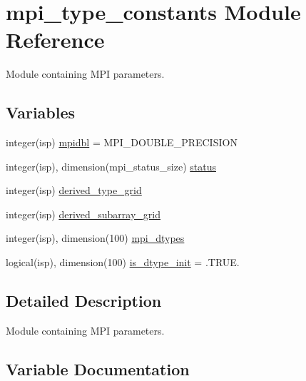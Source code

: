 \hypertarget{namespacempi__type__constants}{}\section{mpi\+\_\+type\+\_\+constants Module Reference}
\label{namespacempi__type__constants}


Module containing M\+PI parameters.  


\subsection*{Variables}
\begin{DoxyCompactItemize}
\item 
integer(isp) \hyperlink{namespacempi__type__constants_a19270446a7b267fa3b13821e93b1744f}{mpidbl} = M\+P\+I\+\_\+\+D\+O\+U\+B\+L\+E\+\_\+\+P\+R\+E\+C\+I\+S\+I\+ON
\item 
integer(isp), dimension(mpi\+\_\+status\+\_\+size) \hyperlink{namespacempi__type__constants_a364a6ee99d8c7ba31bde4f8d2108beaa}{status}
\item 
integer(isp) \hyperlink{namespacempi__type__constants_a4463600d2b1297b8b25562589ae2ed28}{derived\+\_\+type\+\_\+grid}
\item 
integer(isp) \hyperlink{namespacempi__type__constants_ad3a88774f5b3d027503997955c593325}{derived\+\_\+subarray\+\_\+grid}
\item 
integer(isp), dimension(100) \hyperlink{namespacempi__type__constants_a17a815d34db410fbd4e9591e3a0fdd96}{mpi\+\_\+dtypes}
\item 
logical(isp), dimension(100) \hyperlink{namespacempi__type__constants_ad8671c5eb1d13c7171bfb4617dab9a38}{is\+\_\+dtype\+\_\+init} = .T\+R\+U\+E.
\end{DoxyCompactItemize}


\subsection{Detailed Description}
Module containing M\+PI parameters. 

\subsection{Variable Documentation}
